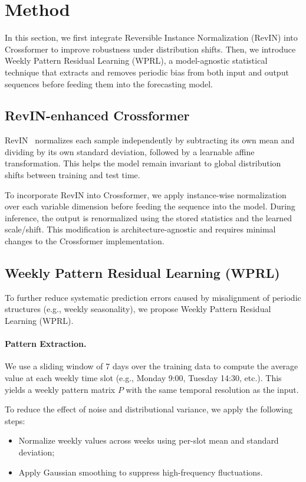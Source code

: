 \documentclass{article}
\begin{document}
\section{Method}

In this section, we first integrate Reversible Instance Normalization (RevIN) into Crossformer to improve robustness under distribution shifts. Then, we introduce Weekly Pattern Residual Learning (WPRL), a model-agnostic statistical technique that extracts and removes periodic bias from both input and output sequences before feeding them into the forecasting model.

\subsection{RevIN-enhanced Crossformer}

RevIN~\cite{kim2022reversible} normalizes each sample independently by subtracting its own mean and dividing by its own standard deviation, followed by a learnable affine transformation. This helps the model remain invariant to global distribution shifts between training and test time.

To incorporate RevIN into Crossformer, we apply instance-wise normalization over each variable dimension before feeding the sequence into the model. During inference, the output is renormalized using the stored statistics and the learned scale/shift. This modification is architecture-agnostic and requires minimal changes to the Crossformer implementation.

\subsection{Weekly Pattern Residual Learning (WPRL)}

To further reduce systematic prediction errors caused by misalignment of periodic structures (e.g., weekly seasonality), we propose Weekly Pattern Residual Learning (WPRL).

\paragraph{Pattern Extraction.}
We use a sliding window of 7 days over the training data to compute the average value at each weekly time slot (e.g., Monday 9:00, Tuesday 14:30, etc.). This yields a weekly pattern matrix $P$ with the same temporal resolution as the input.

To reduce the effect of noise and distributional variance, we apply the following steps:
\begin{itemize}
    \item Normalize weekly values across weeks using per-slot mean and standard deviation;
    \item Apply Gaussian smoothing to suppress high-frequency fluctuations.
\end{itemize}
\end{document}
